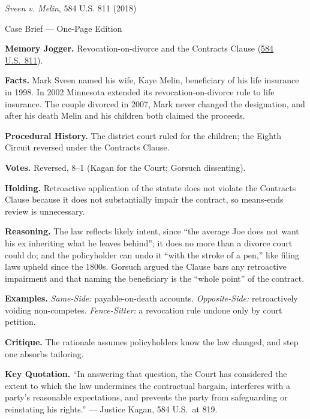 \documentclass[12pt]{article}
\begin{document}
\begin{center}
{\Large \textit{Sveen v. Melin}, 584 U.S. 811 (2018)\par}
\vspace{0.3em}
{\normalsize Case Brief --- One-Page Edition\par}
\end{center}

\textbf{Memory Jogger.} Revocation-on-divorce and the Contracts Clause (\href{https://supreme.justia.com/cases/federal/us/584/16-1432/}{584 U.S.\ 811}).

\textbf{Facts.} Mark Sveen named his wife, Kaye Melin, beneficiary of his life insurance in 1998. In 2002 Minnesota extended its revocation-on-divorce rule to life insurance. The couple divorced in 2007, Mark never changed the designation, and after his death Melin and his children both claimed the proceeds.

\textbf{Procedural History.} The district court ruled for the children; the Eighth Circuit reversed under the Contracts Clause.

\textbf{Votes.} Reversed, 8--1 (Kagan for the Court; Gorsuch dissenting).

\textbf{Holding.} Retroactive application of the statute does not violate the Contracts Clause because it does not substantially impair the contract, so means-ends review is unnecessary.

\textbf{Reasoning.} The law reflects likely intent, since ``the average Joe does not want his ex inheriting what he leaves behind''; it does no more than a divorce court could do; and the policyholder can undo it ``with the stroke of a pen,'' like filing laws upheld since the 1800s. Gorsuch argued the Clause bars any retroactive impairment and that naming the beneficiary is the ``whole point'' of the contract.

\textbf{Examples.} \emph{Same-Side:} payable-on-death accounts. \emph{Opposite-Side:} retroactively voiding non-competes. \emph{Fence-Sitter:} a revocation rule undone only by court petition.

\textbf{Critique.} The rationale assumes policyholders know the law changed, and step one absorbs tailoring.

\textbf{Key Quotation.} ``In answering that question, the Court has considered the extent to which the law undermines the contractual bargain, interferes with a party's reasonable expectations, and prevents the party from safeguarding or reinstating his rights.'' --- Justice Kagan, 584 U.S.\ at 819.
\end{document}
